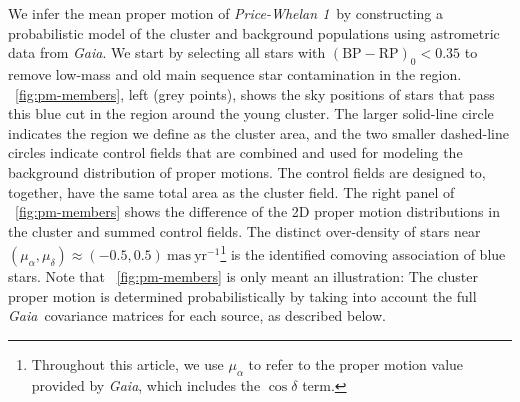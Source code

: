 \documentclass[twocolumn]{aastex62}
\newcommand{\gaia}{\textsl{Gaia}}
\newcommand{\masyr}{\ensuremath{\textrm{mas}~\textrm{yr}^{-1}}}
\newcommand{\clustername}{\textsl{Price-Whelan 1}}
\newcommand{\bprp}{\ensuremath{\textrm{BP} - \textrm{RP}}}
\begin{document}
We infer the mean proper motion of \clustername\ by constructing a probabilistic model of the cluster and background populations using astrometric data from \gaia.
We start by selecting all stars with $(\bprp)_0 < 0.35$ to remove low-mass and old main sequence star contamination in the region.
\figurename~\ref{fig:pm-members}, left (grey points), shows the sky positions of stars that pass this blue cut in the region around the young cluster.
The larger solid-line circle indicates the region we define as the cluster area, and the two smaller dashed-line circles indicate control fields that are combined and used for modeling the background distribution of proper motions.
The control fields are designed to, together, have the same total area as the cluster field.
The right panel of \figurename~\ref{fig:pm-members} shows the difference of the 2D proper motion distributions in the cluster and summed control fields.
The distinct over-density of stars near $(\mu_\alpha, \mu_\delta) \approx (-0.5, 0.5)~\masyr$\footnote{Throughout this article, we use $\mu_\alpha$ to refer to the proper motion value provided by \gaia, which includes the $\cos\delta$ term.} is the identified comoving association of blue stars.
Note that \figurename~\ref{fig:pm-members} is only meant an illustration: The cluster proper motion is determined probabilistically by taking into account the full \gaia\ covariance matrices for each source, as described below.
\end{document}
